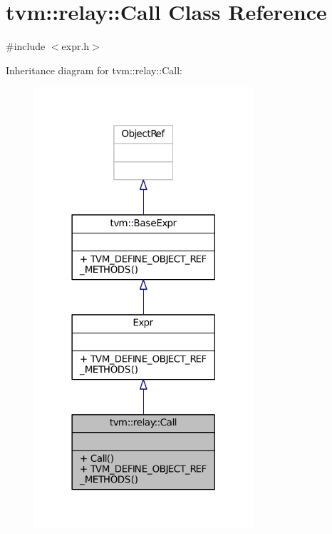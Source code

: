 \hypertarget{classtvm_1_1relay_1_1Call}{}\section{tvm\+:\+:relay\+:\+:Call Class Reference}
\label{classtvm_1_1relay_1_1Call}


{\ttfamily \#include $<$expr.\+h$>$}



Inheritance diagram for tvm\+:\+:relay\+:\+:Call\+:
\nopagebreak
\begin{figure}[H]
\begin{center}
\leavevmode
\includegraphics[width=230pt]{classtvm_1_1relay_1_1Call__inherit__graph}
\end{center}
\end{figure}


